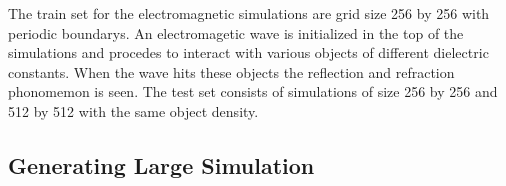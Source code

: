 \documentclass{article}
\begin{document}
The train set for the electromagnetic simulations are grid size 256 by 256 with periodic boundarys. An electromagetic wave is initialized in the top of the simulations and procedes to interact with various objects of different dielectric constants. When the wave hits these objects the reflection and refraction phonomemon is seen. The test set consists of simulations of size 256 by 256 and 512 by 512 with the same object density.

\subsection{Generating Large Simulation}

\begin{figure}[!t]
\centering
{}

\end{figure}
\end{document}
